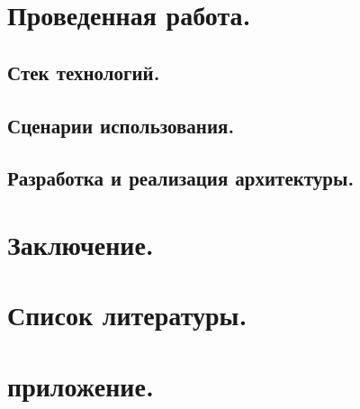 \documentclass[12pt, russian]{extarticle}
\begin{document}
\begin{spacing}{1.5}
    \newpage
    \section{Проведенная работа.}

    \newpage
    \subsection{Стек технологий.}

    \newpage
    \subsection{Сценарии использования.}

    \newpage
    \subsection{Разработка и реализация архитектуры.}

    \newpage
    \section{Заключение.}

    \newpage
    \section{Список литературы.}

    \newpage
    \section{приложение.}
    
    \end{spacing}
\end{document}
